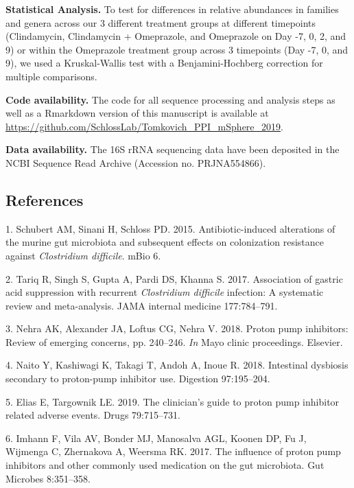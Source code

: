 \documentclass[11pt,]{article}
\begin{document}
\textbf{Statistical Analysis.} To test for differences in relative
abundances in families and genera across our 3 different treatment
groups at different timepoints (Clindamycin, Clindamycin + Omeprazole,
and Omeprazole on Day -7, 0, 2, and 9) or within the Omeprazole
treatment group across 3 timepoints (Day -7, 0, and 9), we used a
Kruskal-Wallis test with a Benjamini-Hochberg correction for multiple
comparisons.

\textbf{Code availability.} The code for all sequence processing and
analysis steps as well as a Rmarkdown version of this manuscript is
available at
\url{https://github.com/SchlossLab/Tomkovich_PPI_mSphere_2019}.

\textbf{Data availability.} The 16S rRNA sequencing data have been
deposited in the NCBI Sequence Read Archive (Accession no. PRJNA554866).

\newpage

\subsection{References}\label{references}

\hypertarget{refs}{}
\hypertarget{ref-Schubert2015}{}
1. Schubert AM, Sinani H, Schloss PD. 2015. Antibiotic-induced
alterations of the murine gut microbiota and subsequent effects on
colonization resistance against \emph{Clostridium difficile}. mBio 6.

\hypertarget{ref-tariq2017association}{}
2. Tariq R, Singh S, Gupta A, Pardi DS, Khanna S. 2017. Association of
gastric acid suppression with recurrent \emph{Clostridium difficile}
infection: A systematic review and meta-analysis. JAMA internal medicine
177:784--791.

\hypertarget{ref-nehra2018proton}{}
3. Nehra AK, Alexander JA, Loftus CG, Nehra V. 2018. Proton pump
inhibitors: Review of emerging concerns, pp. 240--246. \emph{In} Mayo
clinic proceedings. Elsevier.

\hypertarget{ref-Naito2018}{}
4. Naito Y, Kashiwagi K, Takagi T, Andoh A, Inoue R. 2018. Intestinal
dysbiosis secondary to proton-pump inhibitor use. Digestion 97:195--204.

\hypertarget{ref-Elias2019}{}
5. Elias E, Targownik LE. 2019. The clinician's guide to proton pump
inhibitor related adverse events. Drugs 79:715--731.

\hypertarget{ref-Imhann2017}{}
6. Imhann F, Vila AV, Bonder MJ, Manosalva AGL, Koonen DP, Fu J,
Wijmenga C, Zhernakova A, Weersma RK. 2017. The influence of proton pump
inhibitors and other commonly used medication on the gut microbiota. Gut
Microbes 8:351--358.
\end{document}
